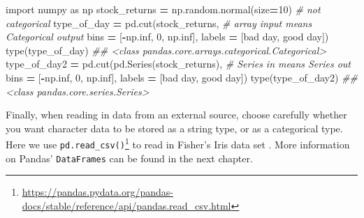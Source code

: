 \documentclass[
  12pt,
]{krantz}
\makeatletter
\newenvironment{Shaded}{\begin{snugshade}}{\end{snugshade}}
\newcommand{\BuiltInTok}[1]{#1}
\newcommand{\CommentTok}[1]{\textcolor[rgb]{0.37,0.37,0.37}{\textit{#1}}}
\newcommand{\DecValTok}[1]{\textcolor[rgb]{0.06,0.06,0.06}{#1}}
\newcommand{\ImportTok}[1]{#1}
\newcommand{\NormalTok}[1]{#1}
\newcommand{\OperatorTok}[1]{\textcolor[rgb]{0.43,0.43,0.43}{\textbf{#1}}}
\newcommand{\StringTok}[1]{\textcolor[rgb]{0.5,0.5,0.5}{#1}}
\renewcommand{\href}[2]{#2\footnote{\url{#1}}}
\newenvironment{kframe}{%
\medskip{}
\setlength{\fboxsep}{.8em}
 \def\at@end@of@kframe{}%
 \ifinner\ifhmode%
  \def\at@end@of@kframe{\end{minipage}}%
  \begin{minipage}{\columnwidth}%
 \fi\fi%
 \def\FrameCommand##1{\hskip\@totalleftmargin \hskip-\fboxsep
 \colorbox{shadecolor}{##1}\hskip-\fboxsep
     \hskip-\linewidth \hskip-\@totalleftmargin \hskip\columnwidth}%
 \MakeFramed {\advance\hsize-\width
   \@totalleftmargin\z@ \linewidth\hsize
   \@setminipage}}%
 {\par\unskip\endMakeFramed%
 \at@end@of@kframe}
\renewenvironment{Shaded}{\begin{kframe}}{\end{kframe}}
\makeatother
\begin{document}
\begin{Shaded}
\begin{Highlighting}[]
\ImportTok{import}\NormalTok{ numpy }\ImportTok{as}\NormalTok{ np}
\NormalTok{stock\_returns }\OperatorTok{=}\NormalTok{ np.random.normal(size}\OperatorTok{=}\DecValTok{10}\NormalTok{) }\CommentTok{\# not categorical }
\NormalTok{type\_of\_day }\OperatorTok{=}\NormalTok{ pd.cut(stock\_returns, }\CommentTok{\# array input means Categorical output}
\NormalTok{                     bins }\OperatorTok{=}\NormalTok{ [}\OperatorTok{{-}}\NormalTok{np.inf, }\DecValTok{0}\NormalTok{, np.inf], }
\NormalTok{                     labels }\OperatorTok{=}\NormalTok{ [}\StringTok{\textquotesingle{}bad day\textquotesingle{}}\NormalTok{, }\StringTok{\textquotesingle{}good day\textquotesingle{}}\NormalTok{]) }
\BuiltInTok{type}\NormalTok{(type\_of\_day)}
\CommentTok{\#\# \textless{}class \textquotesingle{}pandas.core.arrays.categorical.Categorical\textquotesingle{}\textgreater{}}
\NormalTok{type\_of\_day2 }\OperatorTok{=}\NormalTok{ pd.cut(pd.Series(stock\_returns), }\CommentTok{\# Series in means Series out}
\NormalTok{                      bins }\OperatorTok{=}\NormalTok{ [}\OperatorTok{{-}}\NormalTok{np.inf, }\DecValTok{0}\NormalTok{, np.inf], }
\NormalTok{                      labels }\OperatorTok{=}\NormalTok{ [}\StringTok{\textquotesingle{}bad day\textquotesingle{}}\NormalTok{, }\StringTok{\textquotesingle{}good day\textquotesingle{}}\NormalTok{]) }
\BuiltInTok{type}\NormalTok{(type\_of\_day2)}
\CommentTok{\#\# \textless{}class \textquotesingle{}pandas.core.series.Series\textquotesingle{}\textgreater{}}
\end{Highlighting}
\end{Shaded}

Finally, when reading in data from an external source, choose carefully whether you want character data to be stored as a string type, or as a categorical type. Here we use \href{https://pandas.pydata.org/pandas-docs/stable/reference/api/pandas.read_csv.html}{\texttt{pd.read\_csv()}} to read in Fisher's Iris data set \citep{misc_iris_53}. More information on Pandas' \texttt{DataFrames} can be found in the next chapter.
\end{document}
